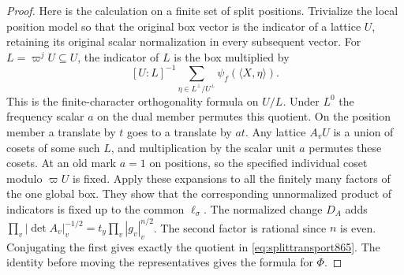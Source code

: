 \documentclass[a4paper,11pt]{article}
\theoremstyle{definition}
\theoremstyle{remark}
\numberwithin{equation}{section}
\begin{document}
\begin{proof}
Here is the calculation on a finite set of split positions.
Trivialize the local position model so that the original box
vector is the indicator of a lattice \(U\), retaining its
original scalar normalization in every subsequent vector.
For \(L=\varpi^jU\subseteq U\), the indicator of \(L\) is
the box multiplied by
\[
        [U:L]^{-1}\sum_{\eta\in L^\perp/U^\perp}
                                      \psi_f(\langle X,\eta\rangle).
\]
This is the finite-character orthogonality formula on \(U/L\).
Under \(L^0\) the frequency scalar \(a\) on the dual member
permutes this quotient. On the position member a translate
by \(t\) goes to a translate by \(a t\). Any lattice \(A_vU\)
is a union of cosets of some such \(L\), and multiplication
by the scalar unit \(a\) permutes these cosets. At an old mark
\(a=1\) on positions, so the specified individual coset
modulo \(\varpi U\) is fixed. Apply these expansions to all
the finitely many factors of the one global box. They show
that the corresponding unnormalized product of indicators
is fixed up to the common \(\ell_\sigma\).
The normalized change \(D_A\) adds
\(\prod_v|\det A_v|_v^{-1/2}
 =t_y\prod_v|g_v|_v^{n/2}\).
The second factor is rational since \(n\) is even. Conjugating
the first gives exactly the quotient in
\eqref{eq:splittransport865}. The identity before moving the
representatives gives the formula for \(\Phi\).
\end{proof}
\end{document}
